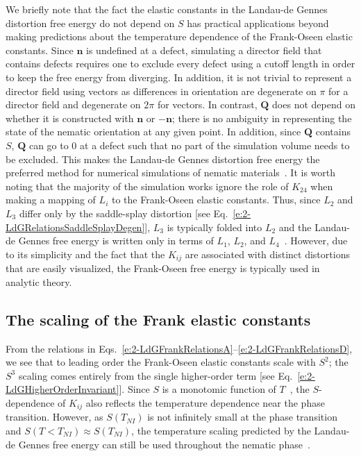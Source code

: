 We briefly note that the fact the elastic constants in the Landau-de Gennes distortion free energy do not depend on $S$ has practical applications beyond making predictions about the temperature dependence of the Frank-Oseen elastic constants.
Since $\mathbf{n}$ is undefined at a defect, simulating a director field that contains defects requires one to exclude every defect using a cutoff length in order to keep the free energy from diverging.
In addition, it is not trivial to represent a director field using vectors as differences in orientation are degenerate on $\pi$ for a director field and degenerate on $2\pi$ for vectors.
In contrast, $\mathbf{Q}$ does not depend on whether it is constructed with $\mathbf{n}$ or $-\mathbf{n}$; there is no ambiguity in representing the state of the nematic orientation at any given point.
In addition, since $\mathbf{Q}$ contains $S$, $\mathbf{Q}$ can go to 0 at a defect such that no part of the simulation volume needs to be excluded.
This makes the Landau-de Gennes distortion free energy the preferred method for numerical simulations of nematic materials~\cite{RN190}.
It is worth noting that the majority of the simulation works ignore the role of $K_{24}$ when making a mapping of $L_i$ to the Frank-Oseen elastic constants.
Thus, since $L_2$ and $L_3$ differ only by the saddle-splay distortion [see Eq.~\ref{e:2-LdGRelationsSaddleSplayDegen}], $L_3$ is typically folded into $L_2$ and the Landau-de Gennes free energy is written only in terms of $L_1$, $L_2$, and $L_4$~\cite{RN198,RN190}.
However, due to its simplicity and the fact that the $K_{ij}$ are associated with distinct distortions that are easily visualized, the Frank-Oseen free energy is typically used in analytic theory.\\


\subsection{The scaling of the Frank elastic constants}
From the relations in Eqs.~\ref{e:2-LdGFrankRelationsA}--\ref{e:2-LdGFrankRelationsD}, we see that to leading order the Frank-Oseen elastic constants scale with $S^2$; the $S^3$ scaling comes entirely from the single higher-order term [see Eq.~\ref{e:2-LdGHigherOrderInvariant}].
Since $S$ is a monotomic function of $T$~\cite{RN33}, the $S$-dependence of $K_{ij}$ also reflects the temperature dependence near the phase transition.
However, as $S(T_{NI})$ is not infinitely small at the phase transition and $S(T < T_{NI}) \approx S(T_{NI})$, the temperature scaling predicted by the Landau-de Gennes free energy can still be used throughout the nematic phase~\cite{RN198}.

